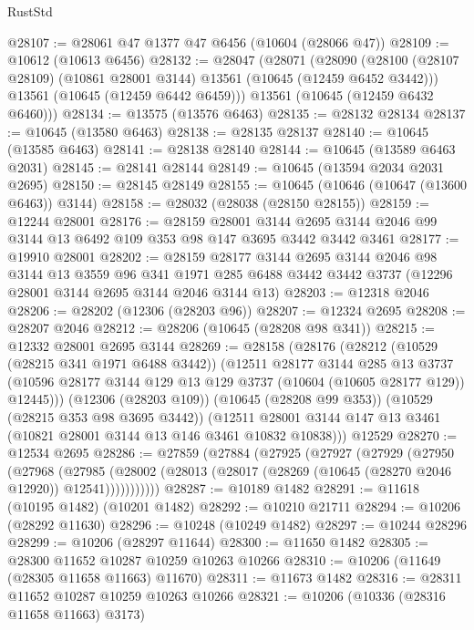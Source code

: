 \begin{lexlean}{RustStd}
\begin{coremodule}
@28107 := @28061 @47 @1377 @47 @6456 (@10604 (@28066 @47))
@28109 := @10612 (@10613 @6456)
@28132 := @28047
    (@28071
      (@28090
        (@28100 (@28107 @28109) (@10861 @28001 @3144) @13561 (@10645 (@12459 @6452 @3442)))
        @13561
        (@10645 (@12459 @6442 @6459)))
      @13561
      (@10645 (@12459 @6432 @6460)))
@28134 := @13575 (@13576 @6463)
@28135 := @28132 @28134
@28137 := @10645 (@13580 @6463)
@28138 := @28135 @28137
@28140 := @10645 (@13585 @6463)
@28141 := @28138 @28140
@28144 := @10645 (@13589 @6463 @2031)
@28145 := @28141 @28144
@28149 := @10645 (@13594 @2034 @2031 @2695)
@28150 := @28145 @28149
@28155 := @10645 (@10646 (@10647 (@13600 @6463)) @3144)
@28158 := @28032 (@28038 (@28150 @28155))
@28159 := @12244 @28001
@28176 := @28159
    @28001
    @3144
    @2695
    @3144
    @2046
    @99
    @3144
    @13
    @6492
    @109
    @353
    @98
    @147
    @3695
    @3442
    @3442
    @3461
@28177 := @19910 @28001
@28202 := @28159
    @28177
    @3144
    @2695
    @3144
    @2046
    @98
    @3144
    @13
    @3559
    @96
    @341
    @1971
    @285
    @6488
    @3442
    @3442
    @3737
    (@12296 @28001 @3144 @2695 @3144 @2046 @3144 @13)
@28203 := @12318 @2046
@28206 := @28202 (@12306 (@28203 @96))
@28207 := @12324 @2695
@28208 := @28207 @2046
@28212 := @28206 (@10645 (@28208 @98 @341))
@28215 := @12332 @28001 @2695 @3144
@28269 := @28158
    (@28176
      (@28212
        (@10529 (@28215 @341 @1971 @6488 @3442))
        (@12511
          @28177
          @3144
          @285
          @13
          @3737
          (@10596 @28177 @3144 @129 @13 @129 @3737 (@10604 (@10605 @28177 @129)) @12445)))
      (@12306 (@28203 @109))
      (@10645 (@28208 @99 @353))
      (@10529 (@28215 @353 @98 @3695 @3442))
      (@12511 @28001 @3144 @147 @13 @3461 (@10821 @28001 @3144 @13 @146 @3461 @10832 @10838)))
    @12529
@28270 := @12534 @2695
@28286 := @27859
    (@27884
      (@27925
        (@27927
          (@27929
            (@27950
              (@27968
                (@27985
                  (@28002 (@28013 (@28017 (@28269 (@10645 (@28270 @2046 @12920)) @12541)))))))))))
@28287 := @10189 @1482
@28291 := @11618 (@10195 @1482) (@10201 @1482)
@28292 := @10210 @21711
@28294 := @10206 (@28292 @11630)
@28296 := @10248 (@10249 @1482)
@28297 := @10244 @28296
@28299 := @10206 (@28297 @11644)
@28300 := @11650 @1482
@28305 := @28300 @11652 @10287 @10259 @10263 @10266
@28310 := @10206 (@11649 (@28305 @11658 @11663) @11670)
@28311 := @11673 @1482
@28316 := @28311 @11652 @10287 @10259 @10263 @10266
@28321 := @10206 (@10336 (@28316 @11658 @11663) @3173)

\end{coremodule}
\end{lexlean}
